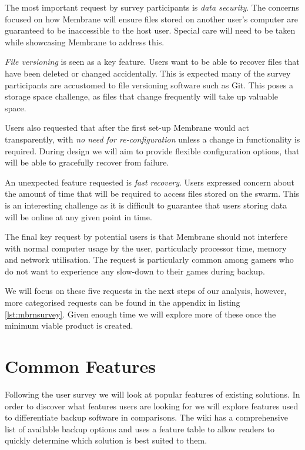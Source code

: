 \documentclass[11pt, a4paper, twocolumn, twoside]{report}
\begin{document}
The most important request by survey participants is \emph{data security}. The concerns focused on how Membrane will ensure files stored on another user's computer are guaranteed to be inaccessible to the host user. Special care will need to be taken while showcasing Membrane to address this.

\emph{File versioning} is seen as a key feature. Users want to be able to recover files that have been deleted or changed accidentally. This is expected many of the survey participants are accustomed to file versioning software such as Git. This poses a storage space challenge, as files that change frequently will take up valuable space.

Users also requested that after the first set-up Membrane would act transparently, with \emph{no need for re-configuration} unless a change in functionality is required. During design we will aim to provide flexible configuration options, that will be able to gracefully recover from failure.

An unexpected feature requested is \emph{fast recovery}. Users expressed concern about the amount of time that will be required to access files stored on the swarm. This is an interesting challenge as it is difficult to guarantee that users storing data will be online at any given point in time.

The final key request by potential users is that Membrane should not interfere with normal computer usage by the user, particularly processor time, memory and network utilisation. The request is particularly common among gamers who do not want to experience any slow-down to their games during backup.

We will focus on these five requests in the next steps of our analysis, however, more categorised requests can be found in the appendix in listing \ref{lst:mbrnsurvey}. Given enough time we will explore more of these once the minimum viable product is created.

\section{Common Features}

Following the user survey we will look at popular features of existing solutions. In order to discover what features users are looking for we will explore features used to differentiate backup software in comparisons. The \cite{arch2017syncandbackup} wiki has a comprehensive list of available backup options and uses a feature table to allow readers to quickly determine which solution is best suited to them.
\end{document}
